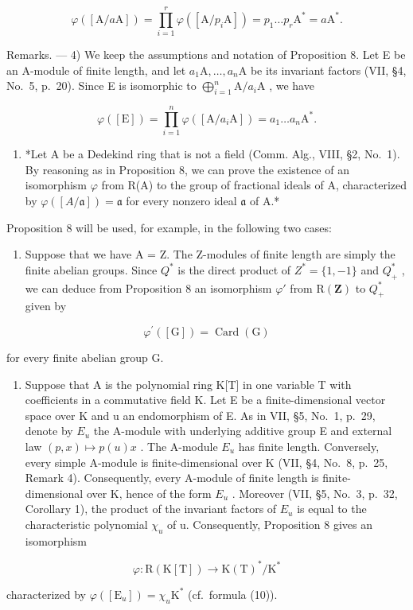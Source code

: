 \[
\varphi ([ \mathrm{A} / a \mathrm{A} ]) = \prod_ {i = 1} ^ {r} \varphi ([ \mathrm{A} / p _ {i} \mathrm{A} ]) = p _ {1} \dots p _ {r} \mathrm{A} ^ {*} = a \mathrm{A} ^ {*}.
\]

Remarks. --- 4) We keep the assumptions and notation of Proposition 8. Let E be an A-module of finite length, and let \(a_{1}\mathrm{A},\ldots ,a_{n}\mathrm{A}\) be its invariant factors (VII, §4, No.~5, p.~20). Since E is isomorphic to \(\bigoplus_{i = 1}^{n}\mathrm{A} / a_i\mathrm{A}\) , we have

\[
\varphi ([ \mathrm{E} ]) = \prod_ {i = 1} ^ {n} \varphi ([ \mathrm{A} / a _ {i} \mathrm{A} ]) = a _ {1} \dots a _ {n} \mathrm{A} ^ {*}.\tag{10}
\]

\begin{enumerate}
\def\labelenumi{\arabic{enumi})}
\setcounter{enumi}{4}
\tightlist
\item
  *Let A be a Dedekind ring that is not a field (Comm. Alg., VIII, §2, No.~1). By reasoning as in Proposition 8, we can prove the existence of an isomorphism \(\varphi\) from R(A) to the group of fractional ideals of A, characterized by \(\varphi([A/\mathfrak{a}]) = \mathfrak{a}\) for every nonzero ideal \(\mathfrak{a}\) of A.*
\end{enumerate}

Proposition 8 will be used, for example, in the following two cases:

\begin{enumerate}
\def\labelenumi{\alph{enumi})}
\tightlist
\item
  Suppose that we have A = Z. The Z-modules of finite length are simply the finite abelian groups. Since \(Q^{*}\) is the direct product of \(Z^{*} = \{1, -1\}\) and \(Q_{+}^{*}\) , we can deduce from Proposition 8 an isomorphism \(\varphi'\) from \(\mathrm{R}(\mathbf{Z})\) to \(Q_{+}^{*}\) given by
\end{enumerate}

\[
\varphi^ {\prime} ([ \mathrm{G} ]) = \operatorname{Card} (\mathrm{G})
\]

for every finite abelian group G.

\begin{enumerate}
\def\labelenumi{\alph{enumi})}
\setcounter{enumi}{1}
\tightlist
\item
  Suppose that A is the polynomial ring K{[}T{]} in one variable T with coefficients in a commutative field K. Let E be a finite-dimensional vector space over K and u an endomorphism of E. As in VII, §5, No.~1, p.~29, denote by \(E_{u}\) the A-module with underlying additive group E and external law \((p, x) \mapsto p(u)x\) . The A-module \(E_{u}\) has finite length. Conversely, every simple A-module is finite-dimensional over K (VII, §4, No.~8, p.~25, Remark 4). Consequently, every A-module of finite length is finite-dimensional over K, hence of the form \(E_{u}\) . Moreover (VII, §5, No.~3, p.~32, Corollary 1), the product of the invariant factors of \(E_{u}\) is equal to the characteristic polynomial \(\chi_{u}\) of u. Consequently, Proposition 8 gives an isomorphism
\end{enumerate}

\[
\varphi : \mathrm{R} (\mathrm{K} [ \mathrm{T} ]) \to \mathrm{K} (\mathrm{T}) ^ {*} / \mathrm{K} ^ {*}
\]

characterized by \(\varphi([\mathrm{E}_u]) = \chi_u\mathrm{K}^*\) (cf.~formula (10)).

